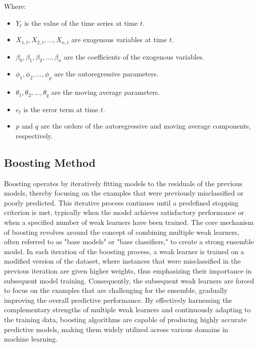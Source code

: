 \documentclass[conference]{IEEEtran}
\begin{document}
Where:
\begin{itemize}
    \item $Y_t$ is the value of the time series at time $t$.
    \item $X_{1,t}, X_{2,t}, \ldots, X_{n,t}$ are exogenous variables at time $t$.
    \item $\beta_0, \beta_1, \beta_2, \ldots, \beta_n$ are the coefficients of the exogenous variables.
    \item $\phi_1, \phi_2, \ldots, \phi_p$ are the autoregressive parameters.
    \item $\theta_1, \theta_2, \ldots, \theta_q$ are the moving average parameters.
    \item $e_t$ is the error term at time $t$.
    \item $p$ and $q$ are the orders of the autoregressive and moving average components, respectively.
\end{itemize}


\subsection{Boosting Method}
Boosting operates by iteratively fitting models to the residuals of the previous models, thereby focusing on the examples that were previously misclassified or poorly predicted. This iterative process continues until a predefined stopping criterion is met, typically when the model achieves satisfactory performance or when a specified number of weak learners have been trained. The core mechanism of boosting revolves around the concept of combining multiple weak learners, often referred to as "base models" or "base classifiers," to create a strong ensemble model. In each iteration of the boosting process, a weak learner is trained on a modified version of the dataset, where instances that were misclassified in the previous iteration are given higher weights, thus emphasizing their importance in subsequent model training. Consequently, the subsequent weak learners are forced to focus on the examples that are challenging for the ensemble, gradually improving the overall predictive performance. By effectively harnessing the complementary strengths of multiple weak learners and continuously adapting to the training data, boosting algorithms are capable of producing highly accurate predictive models, making them widely utilized across various domains in machine learning. 
\end{document}
